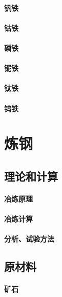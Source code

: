\documentclass[UTF8]{../../ApplicationUniverse}
\begin{document}
    \subsubsection{钒铁}
    \subsubsection{钴铁}
    \subsubsection{磷铁}
    \subsubsection{铌铁}
    \subsubsection{钛铁}
    \subsubsection{钨铁}











\chapter{炼钢}
\section{理论和计算}
    \subsubsection{冶炼原理}
    \subsubsection{冶炼计算}
    \subsubsection{分析、试验方法}
\section{原材料}
    \subsubsection{矿石}
\end{document}
